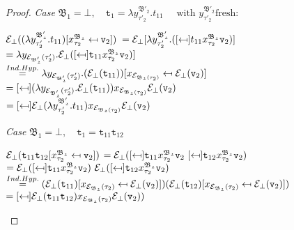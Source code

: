 \begin{proof}
\noindent\textit{Case} $\mathfrak{B_{1} = \bot},\quad
\texttt{t}_{1} = \lambda y^{\mathfrak{B'_{2}}}_{\tau'_{2}}. t_{11} \quad
\text{ with }   y^{\mathfrak{B'_{2}}}_{\tau'_{2}}  \text{fresh}: $
\begin{center}
 $\mathcal{E}_{\bot}
	((\lambda y^{\mathfrak{B'_{2}}}_{\tau'_{2}}. t_{11}) [x^{\mathfrak{B_{2}}}_{\tau_{2}} \mapsfrom \texttt{v}_{2}]) 	$
	$ = \e_{\bot}[\lambda y^{\mathfrak{B'_{2}}}_{\tau'_{2}}.
	(\sbst
		{ t_{11}}
		{x^{\mathfrak{B_{2}}}_{\tau_{2}}}
		{\texttt{v}_{2}})] $\\[0.08cm]
$	= \lambda y_{\e_{\mathfrak{B'_{2}}}(\tau'_{2})}.
		\e_{\bot}(
		\sbst
			{\texttt{t}_{11}}
			{x^{\mathfrak{B_{2}}}_{\tau_{2}}}
			{\texttt{v}_{2}})] $\\[0.08cm]
	$  \stackrel{Ind.Hyp.}{=} 
	\lambda y_{\mathcal{E}_{\mathfrak{B'_{2}}}(\tau'_{2})}.		
		(\mathcal{E}_{\bot}(\texttt{t}_{11})) [x_{\mathcal{E}_{\mathfrak{B_{2}}(\tau_{2})}} \mapsfrom \mathcal{E}_{\bot}(\texttt{v}_{2})]$ \\[0.08cm]
	$= \sbst
			{(\lambda y_{\e_{\mathfrak{B'_{2}}}(\tau'_{2})}.\e_{\bot}(\texttt{t}_{11}))}
			{x_{\e_{\mathfrak{B_{2}}(\tau_{2})}}}
			{\e_{\bot}(\texttt{v}_{2})}$ \\[0.08cm]
	$ = 
	\sbst
			{\e_{\bot}(\lambda y^{\mathfrak{B'_{2}}}_{\tau'_{2}}. t_{11}) }
			{x_{\e_{\mathfrak{B_{2}}(\tau_{2})}}}
			{\e_{\bot}(\texttt{v}_{2})}$
\end{center}

\noindent\textit{Case} $\mathfrak{B_{1} = \bot},\quad
\texttt{t}_{1} = \texttt{t}_{11}\texttt{t}_{12} $
\begin{center}
 $\mathcal{E}_{\bot}
	(\texttt{t}_{11}\texttt{t}_{12} [x^{\mathfrak{B_{2}}}_{\tau_{2}} \mapsfrom \texttt{v}_{2}]) 	$ 
	$= \e_{\bot}
	(\sbst
		{\texttt{t}_{11}}
		{x^{\mathfrak{B_{2}}}_{\tau_{2}}}
		{\texttt{v}_{2}} ~
	\sbst
		{\texttt{t}_{12}}
		{x^{\mathfrak{B_{2}}}_{\tau_{2}}}
		{\texttt{v}_{2}}) 	  $ \\[0.08cm]
		$= \e_{\bot}
	(\sbst
		{\texttt{t}_{11}}
		{x^{\mathfrak{B_{2}}}_{\tau_{2}}}
		{\texttt{v}_{2}}) ~
	\e_{\bot}(\sbst
		{\texttt{t}_{12}}
		{x^{\mathfrak{B_{2}}}_{\tau_{2}}}
		{\texttt{v}_{2}}) 	  $ \\[0.08cm]
		$ \stackrel{Ind.Hyp.}{=} 
		(\mathcal{E}_{\bot}({\texttt{t}_{11}}) [x_{\mathcal{E}_{\mathfrak{B_{2}}}(\tau_{2})} \mapsfrom \mathcal{E}_{\bot}(\texttt{v}_{2})])	
				(\mathcal{E}_{\bot}({\texttt{t}_{12}}) [x_{\mathcal{E}_{\mathfrak{B_{2}}}(\tau_{2})} \mapsfrom \mathcal{E}_{\bot}(\texttt{v}_{2})])	
		 $ \\[0.08cm]
	$ = 
	\sbst
		{\e_{\bot}(\texttt{t}_{11} \texttt{t}_{12})}
		{x_{\e_{\mathfrak{B_{2}}}(\tau_{2})}}
		{\e_{\bot}(\texttt{v}_{2})})	
	$\\[0.08cm]

\end{center}
 \end{proof}



